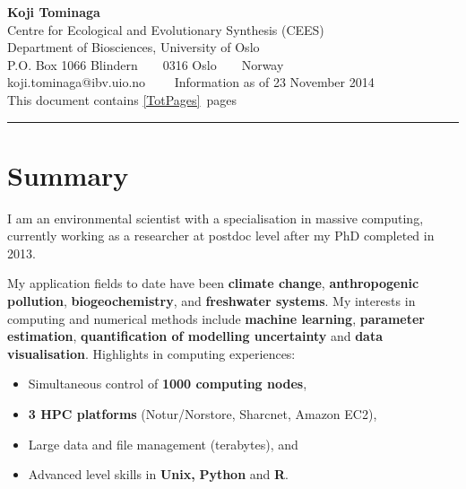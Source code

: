 \documentclass[11pt, a4paper]{article}
\begin{document}
\selectfont


\begin{center} {\LARGE \textbf{Koji Tominaga}}
  \\
  Centre for Ecological and Evolutionary Synthesis (CEES)\\
  Department of Biosciences, University of Oslo\\
  P.O. Box 1066 Blindern\ \ \textbullet \ \ 0316 Oslo\ \ \textbullet \
  \ Norway
  \\
  koji.tominaga@ibv.uio.no \ \ \textbullet \ \ Information as of 23
  November 2014 
  \\
  This document contains \ref{TotPages}~pages
\end{center}

\hrule
\vspace{-0.4em}



\section*{Summary}
I am an environmental scientist with a specialisation in massive
computing, currently working as a researcher at postdoc level after my
PhD completed in 2013.

My application fields to date have been
\textbf{climate change}, \textbf{anthropogenic pollution},
\textbf{biogeochemistry}, and \textbf{freshwater systems}. My
interests in computing and numerical methods include \textbf{machine
  learning}, \textbf{parameter estimation}, \textbf{quantification of
  modelling uncertainty} and \textbf{data visualisation}. Highlights
in computing experiences:
\begin{itemize}
  \itemsep-0.1em
\item Simultaneous control of \textbf{1000 computing nodes},
\item \textbf{3 HPC platforms} (Notur/Norstore, Sharcnet, Amazon EC2),
\item Large data and file management (terabytes), and
\item Advanced level skills in \textbf{Unix,} \textbf{Python} and
  \textbf{R}.
\end{itemize}









\end{document}
